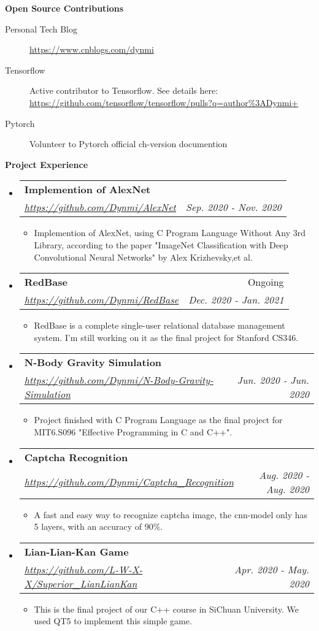 \documentclass[letterpaper,11pt]{article}
\makeatletter
\newcommand{\resitem}[1]{\item #1 \vspace{-2pt}}
\newcommand{\resheading}[1]{{\large \colorbox{mygrey}{\begin{minipage}{\textwidth}{\textbf{#1 \vphantom{p\^{E}}}}\end{minipage}}}}
\newcommand{\ressubheading}[4]{
\begin{tabular*}{7.0in}{l@{\extracolsep{\fill}}r}
		\textbf{#1} & #2 \\
		\textit{#3} & \textit{#4} \\
\end{tabular*}\vspace{-6pt}}
\makeatother
\begin{document}
\resheading{Open Source Contributions}

\begin{description}
\item[Personal Tech Blog] \href{https://www.cnblogs.com/dynmi}{https://www.cnblogs.com/dynmi}
\item[Tensorflow] Active contributor to Tensorflow. See details here: \href{https://github.com/tensorflow/tensorflow/pulls?q=author\%3ADynmi+ }{https://github.com/tensorflow/tensorflow/pulls?q=author\%3ADynmi+ } 
\item[Pytorch] Volunteer to Pytorch official ch-version documention 
\end{description}

\resheading{Project Experience}
\begin{itemize}
\item
	\ressubheading{Implemention of AlexNet }{}{\href{https://github.com/Dynmi/AlexNet}{https://github.com/Dynmi/AlexNet}}{Sep. 2020 - Nov. 2020}
	\begin{itemize}
		\resitem{Implemention of AlexNet, using C Program Language Without Any 3rd Library, according to the paper "ImageNet Classification with Deep Convolutional
Neural Networks" by Alex Krizhevsky,et al.}
	\end{itemize}
\item
	\ressubheading{RedBase }{Ongoing}{\href{https://github.com/Dynmi/RedBase}{https://github.com/Dynmi/RedBase}}{Dec. 2020 - Jan. 2021}
	\begin{itemize}
		\resitem{RedBase is a complete single-user relational database management system. I'm still working on it as the final project for Stanford CS346. }
	\end{itemize}
\item
	\ressubheading{N-Body Gravity Simulation}{}{\href{https://github.com/Dynmi/N-Body-Gravity-Simulation}{https://github.com/Dynmi/N-Body-Gravity-Simulation}}{Jun. 2020 - Jun. 2020}
	\begin{itemize}
		\resitem{Project finished with C Program Language as the final project for MIT6.S096 "Effective Programming in C and C++".}
	\end{itemize}
\item
	\ressubheading{Captcha Recognition}{}{\href{https://github.com/Dynmi/Captcha\_Recognition}{https://github.com/Dynmi/Captcha\_Recognition}}{Aug. 2020 - Aug. 2020}
	\begin{itemize}
		\resitem{} A fast and easy way to recognize captcha image, the cnn-model only has 5 layers, with an accuracy of 90\%.
	\end{itemize}
\item
	\ressubheading{Lian-Lian-Kan Game}{}{\href{https://github.com/L-W-X-X/Superior\_LianLianKan}{https://github.com/L-W-X-X/Superior\_LianLianKan}}{Apr. 2020 - May. 2020}
	\begin{itemize}
		\resitem{} This is the final project of our C++ course in SiChuan University. We used QT5 to implement this simple game.
	\end{itemize}

\end{itemize}
\end{document}
